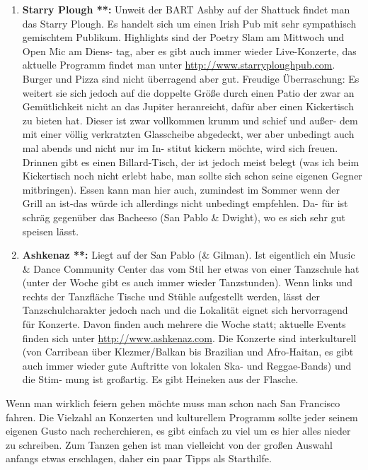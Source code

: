 \documentclass[a4paper]{scrreprt}
\begin{document}
\begin{enumerate}
  \item \textbf{Starry Plough **:} Unweit der BART Ashby auf der Shattuck findet man das Starry Plough. Es handelt sich um einen Irish Pub mit sehr sympathisch gemischtem Publikum. Highlights sind der Poetry Slam am Mittwoch und Open Mic am Diens- tag, aber es gibt auch immer wieder Live-Konzerte, das aktuelle Programm findet man unter \url{http://www.starryploughpub.com}. Burger und Pizza sind nicht überragend aber gut. Freudige Überraschung: Es weitert sie sich jedoch auf die doppelte Größe durch einen Patio der zwar an Gemütlichkeit nicht an das Jupiter heranreicht, dafür aber einen Kickertisch zu bieten hat. Dieser ist zwar vollkommen krumm und schief und außer- dem mit einer völlig verkratzten Glasscheibe abgedeckt, wer aber unbedingt auch mal abends und nicht nur im In- stitut kickern möchte, wird sich freuen. Drinnen gibt es einen Billard-Tisch, der ist jedoch meist belegt (was ich beim Kickertisch noch nicht erlebt habe, man sollte sich schon seine eigenen Gegner mitbringen). Essen kann man hier auch, zumindest im Sommer wenn der Grill an ist-das würde ich allerdings nicht unbedingt empfehlen. Da- für ist schräg gegenüber das Bacheeso (San Pablo \& Dwight), wo es sich sehr gut speisen lässt.
  
  \item \textbf{Ashkenaz **:} Liegt auf der San Pablo (\& Gilman). Ist eigentlich ein Music \& Dance Community Center das vom Stil her etwas von einer Tanzschule hat (unter der Woche gibt es auch immer wieder Tanzstunden). Wenn links und rechts der Tanzfläche Tische und Stühle aufgestellt werden, lässt der Tanzschulcharakter jedoch nach und die Lokalität eignet sich hervorragend für Konzerte. Davon finden auch mehrere die Woche statt; aktuelle Events finden sich unter \url{http://www.ashkenaz.com}. Die Konzerte sind interkulturell (von Carribean über Klezmer/Balkan bis Brazilian und Afro-Haitan, es gibt auch immer wieder gute Auftritte von lokalen Ska- und Reggae-Bands) und die Stim- mung ist großartig. Es gibt Heineken aus der Flasche.

\end{enumerate}
  
Wenn man wirklich feiern gehen möchte muss man schon nach San Francisco fahren. Die Vielzahl an Konzerten und kulturellem Programm sollte jeder seinem eigenen Gusto nach recherchieren, es gibt einfach zu viel um es hier alles nieder zu schreiben. Zum Tanzen gehen ist man vielleicht von der großen Auswahl anfangs etwas erschlagen, daher ein paar Tipps als Starthilfe.
\end{document}
